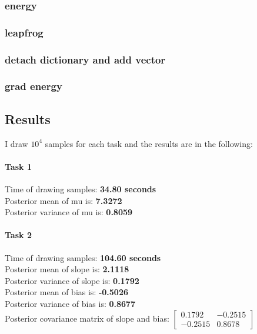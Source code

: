 \documentclass{article}
\begin{document}
\subsubsection{energy}

\subsubsection{leapfrog}

\subsubsection{detach dictionary and add vector}

\subsubsection{grad energy}

\subsection{Results}
I draw $10^4$ samples for each task and the results are in the following:
\paragraph{Task 1}
Time of drawing samples: \textbf{34.80 seconds}\\
Posterior mean of mu is: \textbf{7.3272}\\
Posterior variance of mu is: \textbf{0.8059}
\paragraph{Task 2}
Time of drawing samples: \textbf{104.60 seconds}\\
Posterior mean of slope is: \textbf{2.1118}\\
Posterior variance of slope is: \textbf{0.1792}\\
Posterior mean of bias is: \textbf{-0.5026}\\
Posterior variance of bias is: \textbf{0.8677}\\
Posterior covariance matrix of slope and bias:
$\begin{bmatrix}
0.1792 & -0.2515 \\
-0.2515 & 0.8678
\end{bmatrix}$
\end{document}
